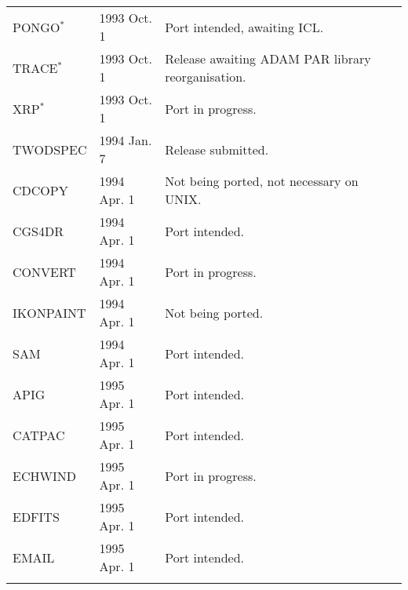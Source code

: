 \begin{table}
\begin{center}
\begin{tabular}{|p{36mm}|p{30mm}|p{60mm}|}
PONGO$^{\ast}$                  & 1993 Oct. 1  & Port intended, awaiting ICL. \\
TRACE$^{\ast}$                  & 1993 Oct. 1  & Release awaiting ADAM PAR
   library reorganisation.\\
XRP$^{\ast}$                    & 1993 Oct. 1  & Port in progress. \\
TWODSPEC                        & 1994 Jan. 7  & Release submitted. \\
CDCOPY                          & 1994 Apr. 1  & Not being ported, not
   necessary on UNIX. \\
CGS4DR                          & 1994 Apr. 1  & Port intended. \\
CONVERT                         & 1994 Apr. 1  & Port in progress. \\
IKONPAINT                       & 1994 Apr. 1  & Not being ported. \\
SAM                             & 1994 Apr. 1  & Port intended. \\
APIG                            & 1995 Apr. 1  & Port intended. \\
CATPAC                          & 1995 Apr. 1  & Port intended. \\
ECHWIND                         & 1995 Apr. 1  & Port in progress. \\
EDFITS                          & 1995 Apr. 1  & Port intended. \\
EMAIL                           & 1995 Apr. 1  & Port intended. \\
& & \\ \hline
\end{tabular}
\end{center}
\end{table}

